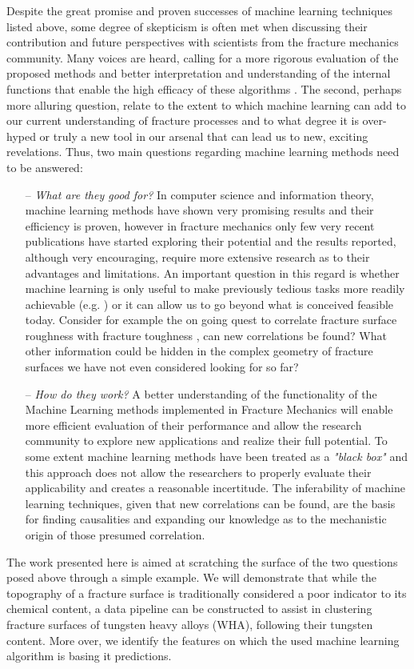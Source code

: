 \documentclass[authoryear,preprint,review,12pt, singleside]{elsarticle}
\begin{document}
Despite the great promise and proven successes of machine learning techniques listed above, some degree of skepticism is often met when discussing their contribution and future perspectives with scientists from the fracture mechanics community. Many voices are heard, calling for a more rigorous evaluation of the proposed methods and better interpretation and understanding of the internal functions that enable the high efficacy of these algorithms \citep{blackbox}. The second, perhaps more alluring question, relate to the extent to which machine learning can add to our current understanding of fracture processes and to what degree it is over-hyped or truly a new tool in our arsenal that can lead us to new, exciting revelations. Thus, two main questions regarding machine learning methods need to be answered:

\begin{itemize}
	\item[--] \textit{What are they good for?} In computer science and information theory, machine learning methods have shown very promising results and their efficiency is proven, however in fracture mechanics only few very recent publications have started exploring their potential and the results reported, although very encouraging, require more extensive research as to their advantages and limitations. An important question in this regard is whether machine learning is only useful to make previously tedious tasks more readily achievable (e.g. \cite{qf1} ) or it can allow us to go beyond what is conceived feasible today.  Consider for example the on going quest to correlate fracture surface roughness with fracture toughness \citep{barak2019, mandelbrot1984, Ankit2014}, can new correlations be found? What other information could be hidden in the complex geometry of fracture surfaces we have not even considered looking for so far? 
	\item[--] \textit{How do they work?} A better understanding of the functionality of the Machine Learning methods implemented in Fracture Mechanics will enable more efficient evaluation of their performance and allow the research community to explore new applications and realize their full potential. To some extent machine learning methods have been treated as a \textit{"black box"} and this approach does not allow the researchers to properly evaluate their applicability and creates a reasonable incertitude. The inferability of machine learning techniques, given that new correlations can be found, are the basis for finding causalities and expanding our knowledge as to the mechanistic origin of those presumed correlation. 
\end{itemize}
The work presented here is aimed at scratching the surface of the two questions posed above through a simple  example. We will demonstrate that while the topography of a fracture surface is traditionally considered a poor indicator to its chemical content, a data pipeline can be constructed to assist in clustering fracture surfaces of tungsten heavy alloys (WHA), following their tungsten content. More over, we identify the features on which the used machine learning algorithm is basing it predictions. 
\end{document}
